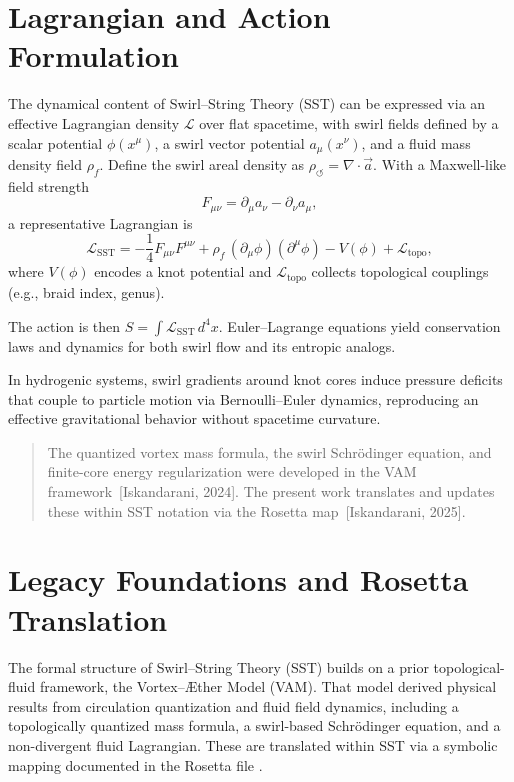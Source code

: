 \documentclass[11pt]{article}
\newcommand{\rhof}{\rho_{\!f}}                           %
\begin{document}
\section{Lagrangian and Action Formulation}
    The dynamical content of Swirl–String Theory (SST) can be expressed via an effective Lagrangian density $\mathcal{L}$ over flat spacetime, with swirl fields defined by a scalar potential $\phi(x^\mu)$, a swirl vector potential $a_\mu(x^\nu)$, and a fluid mass density field $\rhof$. Define the swirl areal density as $\rho_{\circlearrowleft} = \nabla \cdot \vec{a}$. With a Maxwell-like field strength
    \[
        F_{\mu\nu} = \partial_\mu a_\nu - \partial_\nu a_\mu,
    \]
    a representative Lagrangian is
    \[
        \mathcal{L}_{\text{SST}} = -\frac{1}{4} F_{\mu\nu} F^{\mu\nu} + \rhof\, (\partial_\mu \phi)(\partial^\mu \phi) - V(\phi) + \mathcal{L}_\text{topo},
    \]
    where $V(\phi)$ encodes a knot potential and $\mathcal{L}_\text{topo}$ collects topological couplings (e.g., braid index, genus).

    The action is then $S = \int \mathcal{L}_{\text{SST}} \, d^4x$. Euler–Lagrange equations yield conservation laws and dynamics for both swirl flow and its entropic analogs.

    In hydrogenic systems, swirl gradients around knot cores induce pressure deficits that couple to particle motion via Bernoulli–Euler dynamics, reproducing an effective gravitational behavior without spacetime curvature.

    \begin{quote}
    The quantized vortex mass formula, the swirl Schrödinger equation, and finite-core energy regularization were developed in the VAM framework~[Iskandarani, 2024]. The present work translates and updates these within SST notation via the Rosetta map~[Iskandarani, 2025]. %
    \end{quote}



\section{Legacy Foundations and Rosetta Translation}
\label{sec:legacy-rosetta}

    The formal structure of Swirl–String Theory (SST) builds on a prior topological-fluid framework, the Vortex–Æther Model (VAM). That model derived physical results from circulation quantization and fluid field dynamics, including a topologically quantized mass formula, a swirl-based Schrödinger equation, and a non-divergent fluid Lagrangian. These are translated within SST via a symbolic mapping documented in the Rosetta file \cite{VAM-15, vamrosetta2025}.
\end{document}
